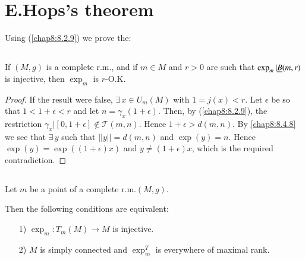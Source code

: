 \section{E.\@ Hops's theorem}\label{chap8:sec7}\pageoriginale

Using (\ref{chap8:8.2.9}) we prove the:

\subsection{}\label{chap8:8.7.1}

\begin{lemma*}
If $(M,g)$ is a complete r.m., and if $m\in M$ and $r>0$ are such that
$\exp_{m}|\underline{B}(m,r)$ is injective, then $\exp_{m}$ is $r$-O.K.
\end{lemma*}

\begin{proof}
If the result were false, $\exists\, x\in U_{m}(M)$ with
$1=j(x)<r$. Let $\epsilon$ be so that $1<1+\epsilon<r$ and let
$n=\gamma_{x}(1+\epsilon)$. Then, by (\ref{chap8:8.2.9}), the
restriction $\gamma_{x}|[0,1+\epsilon]\not\in \mathscr{T}(m,n)$. Hence
$1+\epsilon>d(m,n)$. By \eqref{chap8:8.4.8} we see that $\exists\, y$ such
that $||y||=d(m,n)$ and $\exp(y)=n$. Hence
$\exp(y)=\exp((1+\epsilon)x)$ and $y\neq (1+\epsilon)x$, which is the
required contradiction.
\end{proof}

\subsection{}\label{chap8:8.7.2}

\begin{prop*}
Let $m$ be a point of a complete r.m.\@ $(M,g)$. 

Then the following conditions are equivalent:
\begin{itemize}
\item[\rm 1)] $\exp_{m}:T_{m}(M)\to M$ is injective.

\item[\rm 2)] $M$ is simply connected and $\exp^{T}_{m}$ is everywhere
  of maximal rank.
\end{itemize}
\end{prop*}


